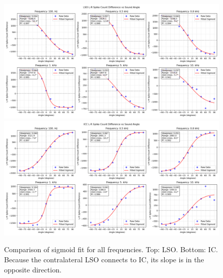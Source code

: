 \documentclass[11pt,a4paper]{article}
\begin{document}
\begin{figure}[H]
    \centering
    \includegraphics[width=1\linewidth]{Images/LSOfit.png}
    \includegraphics[width=1\linewidth]{Images/ICCfit.png}
    \caption{Comparison of sigmoid fit for all frequencies. Top: LSO. Bottom: IC. Because the contralateral LSO connects to IC, its slope is in the opposite direction.}
    \label{fig:lso-icc-fit-sigmoid}
\end{figure}
\end{document}
